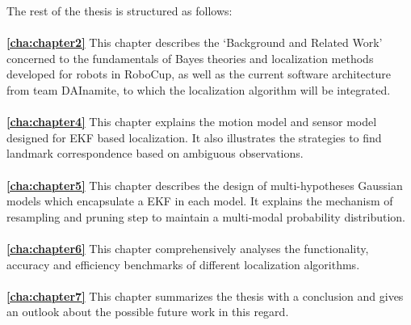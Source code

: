 The rest of the thesis is structured as follows:
\\
\\
\textbf{\autoref{cha:chapter2}} This chapter describes the `Background and Related Work' concerned to the fundamentals of Bayes theories and localization methods developed for robots in RoboCup, as well as the current software architecture from team DAInamite, to which the localization algorithm will be integrated. 
\\
\\
\textbf{\autoref{cha:chapter4}} This chapter explains the motion model and sensor model designed for \gls{EKF} based localization. It also illustrates the strategies to find landmark correspondence based on ambiguous observations. 
\\
\\
\textbf{\autoref{cha:chapter5}} This chapter describes the design of multi-hypotheses Gaussian models which encapsulate a \gls{EKF} in each model. It explains the mechanism of resampling and pruning step to maintain a multi-modal probability distribution.
\\
\\
\textbf{\autoref{cha:chapter6}} This chapter comprehensively analyses the functionality, accuracy and efficiency benchmarks of different localization algorithms.
\\
\\
\textbf{\autoref{cha:chapter7}} This chapter summarizes the thesis with a conclusion and gives an outlook about the possible future work in this regard.
\\
\\
